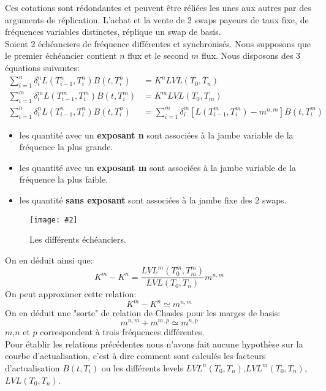 \documentclass{article}
\newcommand{\FIG}[2]{\texttt{[image: \#2]}}
\begin{document}
Ces cotations sont rédondantes et peuvent être réliées les unes aux autres par des arguments de réplication. L'achat et la vente de 2 swaps payeurs de taux fixe, de fréquences variables distinctes, réplique un swap de basis.\\

Soient 2 échéanciers de fréquence différentes et synchronisés. Nous supposons que le premier échéancier contient $n$ flux et le second $m$ flux. Nous disposons des 3 équations suivantes:
\[
\begin{split}
\sum_{i=1}^{n} \delta^n_i L(T^n_{i-1},T^n_{i}) B(t,T^n_{i})&=K^n LVL(T_0,T_n)\\
\sum_{i=1}^{m} \delta^m_i L(T^m_{i-1},T^m_{i}) B(t,T^m_{i})&=K^m LVL(T_0,T_m)\\
\sum_{i=1}^{n} \delta^n_i L(T^n_{i-1},T^n_{i}) B(t,T^n_{i})&=\sum_{i=1}^{m} \delta^m_i [L(T^m_{i-1},T^m_{i})-m^{n,m}] B(t,T^m_{i})
\end{split}
\]
\begin{itemize}
\item les quantité avec un  \textbf{exposant n} sont associées à la jambe variable de la fréquence la plus grande.\\
\item les quantité avec un \textbf{exposant m} sont associées à la jambe variable de la fréquence la plus faible.\\
\item les quantité \textbf{sans exposant} sont associées à la jambe fixe des 2 swaps.\\
\end{itemize}

\begin{center}
\begin{figure}[h]
\vspace{2mm}
\FIG{15cm}{figures/basis.png} 
\vspace{1mm}
\caption{Les différents échéanciers.}
\end{figure}
\end{center}


On en déduit ainsi que:
\[
K^m-K^n=\frac{LVL^m(T^m_0,T^m_m)}{LVL(T_0,T_n)} m^{n,m}
\]
On peut approximer cette relation:
\[
K^m-K^n \simeq m^{n,m}
\]
On en déduit une "sorte" de relation de Chasles pour les marges de basis:
\[
m^{n,m}+m^{m,p} \simeq m^{n,p}
\]
$m$,$n$ et $p$ correspondent à trois fréquences différentes.\\

Pour établir les relations précédentes nous n'avons fait aucune hypothèse sur la courbe d'actualisation, c'est à dire comment sont calculés les facteurs d'actualisation $B(t,T_i)$ ou les différents levels $LVL^n(T_0,T_n)$,$LVL^m(T_0,T_n)$,$LVL(T_0,T_n)$.\\
\end{document}
